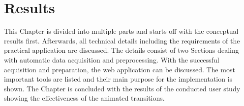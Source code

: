 \section{Results}
\label{s:results}
\cbstart
This Chapter is divided into multiple parts and starts off with the conceptual results first. Afterwards, all technical details including the requirements of the practical application are discussed. The details consist of two Sections dealing with automatic data acquisition and preprocessing. With the successful acquisition and preparation, the web application can be discussed. The most important tools are listed and their main purpose for the implementation is shown. The Chapter is concluded with the results of the conducted user study showing the effectiveness of the animated transitions.
\cbend


